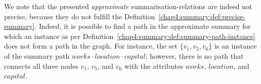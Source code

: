 We note that the presented \emph{approximate} \glspl{summarisation-relation} are indeed not precise, because they do not fulfill the Definition~\ref{chap4:summary:def:precise-summary}. Indeed, it is possible to find a path in the approximate summary for which an instance as per Definition~\ref{chap4:summary:def:summary-path-instance} does not form a path in the graph. For instance, the set $\{v_1, v_5, v_6\}$ is an instance of the summary path $works \cdot location \cdot capital$; however, there is no path that connects all three nodes $v_1$, $v_5$, and $v_6$ with the attributes $works$, $location$, and $capital$.
